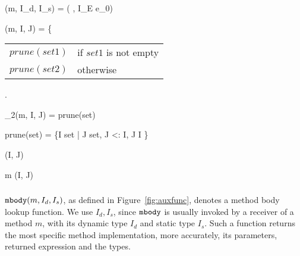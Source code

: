 \begin{figure*}[htbp]
	\begin{mathpar}
		{\mbody(m, I_d, I_s) = ( \; , I_E \; e_0)}
	
	{\mostSpecific(m, I, J) = \left\{{\begin{tabular}{ll}
				$prune(set1)$ & if $set1$ is not empty \\ $prune(set2)$ & otherwise
			\end{tabular}}\right.}
	
		{\mostSpecific_2(m, I, J) = prune(set)}
	
	prune(set) = \{I \in set \; | \; \nexists J \in set, J <: I, J \neq I \}
	
	{\ext(I, J)}
	
	{m \in \updateSet(I, J)}
	\end{mathpar}
	\caption{Auxiliary functions.}\label{fig:auxfunc}
\end{figure*}


\subsubsection{\mbody}

$\texttt{mbody}(m, I_d, I_s)$, as defined in Figure~\ref{fig:auxfunc}, denotes a method body lookup function.
We use $I_d, I_s$, since $\texttt{mbody}$ is usually invoked by a receiver of a method $m$, with its dynamic
type $I_d$ and static type $I_s$. Such a function returns the most specific method implementation, more
accurately, its parameters, returned expression and the types.

